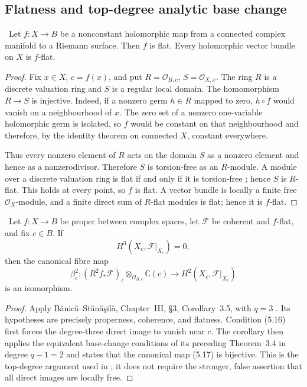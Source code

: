 \subsection{Flatness and top-degree analytic base change}

\begin{lemma}
\label{lem:curve-flatness}
\Verified\ Let $f:X\to B$ be a nonconstant holomorphic map from a connected
complex manifold to a Riemann surface.  Then $f$ is flat.  Every holomorphic
vector bundle on $X$ is $f$-flat.
\end{lemma}

\begin{proof}
Fix $x\in X$, $c=f(x)$, and put
$R=\mathcal O_{B,c}$, $S=\mathcal O_{X,x}$.  The ring $R$ is a discrete
valuation ring and $S$ is a regular local domain.  The homomorphism
$R\to S$ is injective.  Indeed, if a nonzero germ $h\in R$ mapped to zero,
$h\circ f$ would vanish on a neighbourhood of $x$.  The zero set of a
nonzero one-variable holomorphic germ is isolated, so $f$ would be constant
on that neighbourhood and therefore, by the identity theorem on connected
$X$, constant everywhere.

Thus every nonzero element of $R$ acts on the domain $S$ as a nonzero
element and hence as a nonzerodivisor.  Therefore $S$ is torsion-free as an
$R$-module.  A module over a discrete valuation ring is flat if and only if
it is torsion-free \cite[Tag~0AUW]{StacksProject}; hence $S$ is $R$-flat.
This holds at every point, so $f$ is flat.  A vector bundle is locally a
finite free $\mathcal O_X$-module, and a finite direct sum of $R$-flat
modules is flat; hence it is $f$-flat.
\end{proof}

\begin{proposition}
\label{prop:analytic-base-change}
\Verified\ Let $f:X\to B$ be proper between complex spaces, let
$\mathcal F$ be coherent and $f$-flat, and fix $c\in B$.  If
\[
H^3(X_c,\mathcal F|_{X_c})=0,
\tag{5.16}
\]
then the canonical fibre map
\[
\beta_c^2:
(R^2f_*\mathcal F)_c\otimes_{\mathcal O_{B,c}}\mathbb C(c)
\longrightarrow H^2(X_c,\mathcal F|_{X_c})
\tag{5.17}
\]
is an isomorphism.
\end{proposition}

\begin{proof}
Apply B\u{a}nic\u{a}--St\u{a}n\u{a}\c{s}il\u{a},
Chapter~III, \S3, Corollary~3.5, with $q=3$
\cite[pp.~120--121]{BanicaStanasila1976}.  Its hypotheses are precisely
properness, coherence, and flatness.  Condition (5.16) first forces the
degree-three direct image to vanish near $c$.  The corollary then applies the
equivalent base-change conditions of its preceding Theorem~3.4 in degree
$q-1=2$ and states that the canonical map (5.17) is bijective.  This is the
top-degree argument used in \cite[Lemma~1.5]{CDP1998}; it does not require
the stronger, false assertion that all direct images are locally free.
\end{proof}

